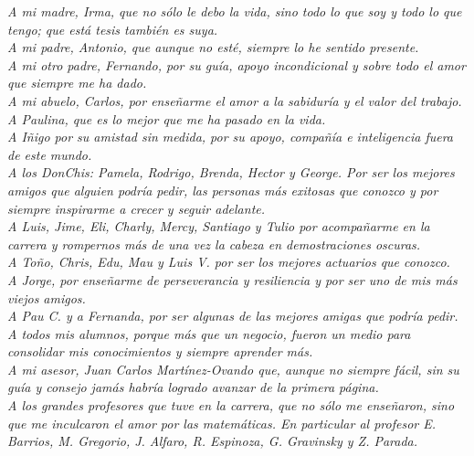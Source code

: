 \documentclass[../Main/Main.tex]{subfiles}
\begin{document}
\thispagestyle{empty}
\setcounter{page}{0} %
\begin{flushright}
	\null{}
	\emph{A mi madre, Irma, que no sólo le debo la vida, sino todo lo que soy y todo lo que tengo; que está tesis también es suya.} 
	\\
	\emph{A mi padre, Antonio, que aunque no esté, siempre lo he sentido presente.} 
	\\
	\emph{A mi otro padre, Fernando, por su guía, apoyo incondicional y sobre todo el amor que siempre me ha dado.}
	\\
	\emph{A mi abuelo, Carlos, por enseñarme el amor a la sabiduría y el valor del trabajo.}	
	\\
	\emph{A Paulina, que es lo mejor que me ha pasado en la vida.}
	\\
	\emph{A Iñigo por su amistad sin medida, por su apoyo, compañía e inteligencia fuera de este mundo.}
	\\
	\emph{A los DonChis: Pamela, Rodrigo, Brenda, Hector y George. Por ser los mejores amigos que alguien podría pedir, las personas más exitosas que conozco y por siempre inspirarme a crecer y seguir adelante.}
	\\
	\emph{A Luis, Jime, Eli, Charly, Mercy, Santiago y Tulio por acompañarme en la carrera y rompernos más de una vez la cabeza en demostraciones oscuras.}
	\\
	\emph{A Toño, Chris, Edu, Mau y Luis V. por ser los mejores actuarios que conozco.}
	\\
	\emph{A Jorge, por enseñarme de perseverancia y resiliencia y por ser uno de mis más viejos amigos.}
	\\
	\emph{A Pau C. y a Fernanda, por ser algunas de las mejores amigas que podría pedir.}
	\\
	\emph{A todos mis alumnos, porque más que un negocio, fueron un medio para consolidar mis conocimientos y siempre aprender más.}
	\\
	\emph{A mi asesor, Juan Carlos Martínez-Ovando que, aunque no siempre fácil,  sin su guía y consejo jamás habría logrado avanzar de la primera página.}	
	\\
	\emph{A los grandes profesores que tuve en la carrera, que no sólo me enseñaron, sino que me inculcaron el amor por las matemáticas. En particular al profesor E. Barrios, M. Gregorio, J. Alfaro, R. Espinoza, G. Gravinsky y Z. Parada.}

\end{flushright}
\end{document}
